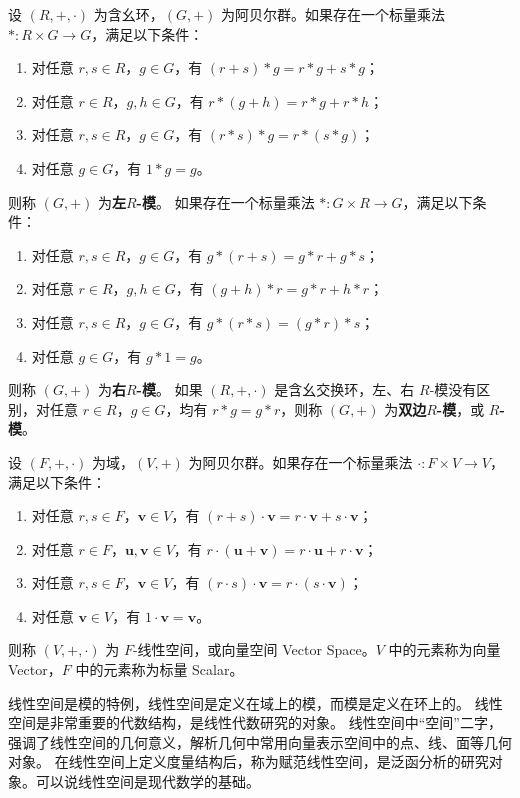 \begin{definition}[模 Module]
    设 $ (R,+,\cdot) $ 为含幺环，$ (G,+) $ 为阿贝尔群。如果存在一个标量乘法 $ *: R\times G \to G $，满足以下条件：
    \begin{enumerate}
        \item 对任意 $ r,s\in R $，$ g\in G $，有 $ (r+s)*g = r*g + s*g $；
        \item 对任意 $ r\in R $，$ g,h\in G $，有 $ r*(g+h) = r*g + r*h $；
        \item 对任意 $ r,s\in R $，$ g\in G $，有 $ (r*s)*g = r*(s*g) $；
        \item 对任意 $ g\in G $，有 $ 1*g = g $。
    \end{enumerate}
    则称 $ (G,+) $ 为\textbf{左$ R $-模}。
    如果存在一个标量乘法 $ *: G\times R \to G $，满足以下条件：
    \begin{enumerate}
        \item 对任意 $ r,s\in R $，$ g\in G $，有 $ g*(r+s) = g*r + g*s $；
        \item 对任意 $ r\in R $，$ g,h\in G $，有 $ (g+h)*r = g*r + h*r $；
        \item 对任意 $ r,s\in R $，$ g\in G $，有 $ g*(r*s) = (g*r)*s $；
        \item 对任意 $ g\in G $，有 $ g*1 = g $。
    \end{enumerate}
    则称 $ (G,+) $ 为\textbf{右$ R $-模}。
    如果 $ (R,+,\cdot) $ 是含幺交换环，左、右 $ R $-模没有区别，对任意 $ r\in R $，$ g\in G $，均有 $ r*g = g*r $，则称 $ (G,+) $ 为\textbf{双边$R$-模}，或 \textbf{$R$-模}。
\end{definition}

\vspace{1em}

\begin{definition}
    设 $ (F,+,\cdot) $ 为域，$ (V,+) $ 为阿贝尔群。如果存在一个标量乘法 $ \cdot: F\times V \to V $，满足以下条件：
    \begin{enumerate}
        \item 对任意 $ r,s\in F $，$ \mathbf{v}\in V $，有 $ (r+s)\cdot \mathbf{v} = r\cdot \mathbf{v} + s\cdot \mathbf{v} $；
        \item 对任意 $ r\in F $，$ \mathbf{u},\mathbf{v}\in V $，有 $ r\cdot (\mathbf{u}+\mathbf{v}) = r\cdot \mathbf{u} + r\cdot \mathbf{v} $；
        \item 对任意 $ r,s\in F $，$ \mathbf{v}\in V $，有 $ (r\cdot s)\cdot \mathbf{v} = r\cdot (s\cdot \mathbf{v}) $；
        \item 对任意 $ \mathbf{v}\in V $，有 $ 1\cdot \mathbf{v} = \mathbf{v} $。
    \end{enumerate}
    则称 $ (V,+,\cdot) $ 为 $ F $-线性空间，或向量空间 Vector Space。$V$ 中的元素称为向量 Vector，$F$ 中的元素称为标量 Scalar。
\end{definition}

\vspace{1em}

\begin{note}
    线性空间是模的特例，线性空间是定义在域上的模，而模是定义在环上的。
    线性空间是非常重要的代数结构，是线性代数研究的对象。
    线性空间中“空间”二字，强调了线性空间的几何意义，解析几何中常用向量表示空间中的点、线、面等几何对象。
    在线性空间上定义度量结构后，称为赋范线性空间，是泛函分析的研究对象。可以说线性空间是现代数学的基础。
\end{note}

\newpage